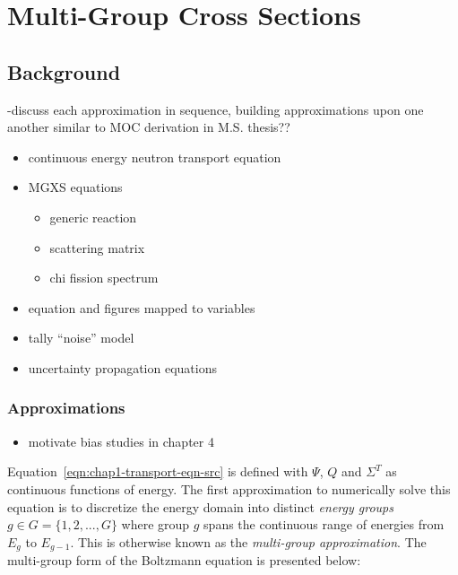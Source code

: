 \chapter{Multi-Group Cross Sections}
\label{chap:mgxs}

\section{Background}
\label{sec:chap2-background}

-discuss each approximation in sequence, building approximations upon one another similar to \ac{MOC} derivation in M.S. thesis??

\begin{itemize}[noitemsep]
  \item continuous energy neutron transport equation
  \item \ac{MGXS} equations
  \begin{itemize}[noitemsep]
    \item generic reaction
    \item scattering matrix
    \item chi fission spectrum
  \end{itemize}
  \item equation and figures mapped to variables
  \item tally ``noise'' model
  \item uncertainty propagation equations
\end{itemize}


\subsection{Approximations}
\label{subsec:chap2-approx}

\begin{itemize}
  \item motivate bias studies in chapter 4
\end{itemize}

Equation~\ref{eqn:chap1-transport-eqn-src} is defined with $\Psi$, $Q$ and $\Sigma^T$ as continuous functions of energy. The first approximation to numerically solve this equation is to discretize the energy domain into distinct \textit{energy groups} $g \in G = \{1, 2, ..., G\}$ where group $g$ spans the continuous range of energies from $E_{g}$ to $E_{g-1}$. This is otherwise known as the \textit{multi-group approximation}. The multi-group form of the Boltzmann equation is presented below:

